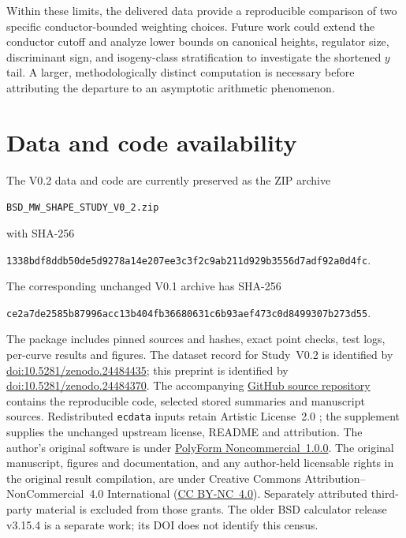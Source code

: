 \documentclass[11pt,a4paper]{article}
\begin{document}
Within these limits, the delivered data provide a reproducible comparison of two specific conductor-bounded weighting choices. Future work could extend the conductor cutoff and analyze lower bounds on canonical heights, regulator size, discriminant sign, and isogeny-class stratification to investigate the shortened $y$ tail. A larger, methodologically distinct computation is necessary before attributing the departure to an asymptotic arithmetic phenomenon.

\section*{Data and code availability}
The V0.2 data and code are currently preserved as the ZIP archive\begin{center}\footnotesize\texttt{BSD\_MW\_SHAPE\_STUDY\_V0\_2.zip}\end{center}with SHA-256
\begin{center}\footnotesize\texttt{1338bdf8ddb50de5d9278a14e207ee3c3f2c9ab211d929b3556d7adf92a0d4fc}.\end{center}
The corresponding unchanged V0.1 archive has SHA-256
\begin{center}\footnotesize\texttt{ce2a7de2585b87996acc13b404fb36680631c6b93aef473c0d8499307b273d55}.\end{center}
The package includes pinned sources and hashes, exact point checks, test logs, per-curve results and figures. The dataset record for Study~V0.2 is identified by \href{https://doi.org/10.5281/zenodo.24484435}{doi:10.5281/zenodo.24484435}; this preprint is identified by \href{https://doi.org/10.5281/zenodo.24484370}{doi:10.5281/zenodo.24484370}. The accompanying \href{https://github.com/eit-orbitos/BSD_MW_RANK2_SHAPE_CENSUS_50000}{GitHub source repository} contains the reproducible code, selected stored summaries and manuscript sources. Redistributed \texttt{ecdata} inputs retain Artistic License~2.0 \cite{CremonaData}; the supplement supplies the unchanged upstream license, README and attribution. The author's original software is under \href{https://polyformproject.org/licenses/noncommercial/1.0.0}{PolyForm Noncommercial~1.0.0}. The original manuscript, figures and documentation, and any author-held licensable rights in the original result compilation, are under Creative Commons Attribution--NonCommercial~4.0 International (\href{https://creativecommons.org/licenses/by-nc/4.0/}{CC BY-NC~4.0}). Separately attributed third-party material is excluded from those grants. The older BSD calculator release v3.15.4 is a separate work; its DOI does not identify this census.
\end{document}
